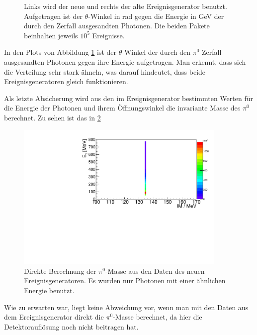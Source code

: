 \documentclass[a4paper,11pt,oneside,final,german,openbib,pdftex]{scrbook}
\begin{document}
{\begin{figure}[h!]
	\caption[Simulation: Vergleich der der Ereignisgeneratoren]{Links wird der neue und rechts der alte Ereignisgenerator benutzt. Aufgetragen ist der $\theta$-Winkel in rad gegen die Energie in GeV der durch den Zerfall ausgesandten Photonen. Die beiden Pakete beinhalten jeweils $10^5$ Ereignisse.}
	\label{fig:Vergleich-der-beiden-Guns}
\end{figure}

In den Plots von Abbildung \ref{fig:Vergleich-der-beiden-Guns} ist der $\theta$-Winkel der durch den $\pi^0$-Zerfall ausgesandten Photonen gegen ihre Energie aufgetragen. 
Man erkennt, dass sich die Verteilung sehr stark \"ahneln, was darauf hindeutet, dass beide Ereignisgeneratoren gleich funktionieren.

Als letzte Absicherung wird aus den im Ereignisgenerator bestimmten Werten f\"ur die Energie der Photonen und ihrem \"Offnungswinkel die invariante Masse des $\pi^0$ berechnet. Zu sehen ist das in \cref{fig:Direkte-Berechnung-der-PI-Masse}

\begin{figure}[h!]
	\centering

		\centering
		\includegraphics[width=0.9\textwidth]{20172504MCTrueME1}
		\caption[Simulation: Direkte Berechnung der $\pi^0$-Masse aus dem neuen Ereignisgenerator]{Direkte Berechnung der $\pi^0$-Masse aus den Daten des neuen Ereignisgeneratoren. Es wurden nur Photonen mit einer \"ahnlichen Energie benutzt.}
		\label{fig:Direkte-Berechnung-der-PI-Masse}

\end{figure}

Wie zu erwarten war, liegt keine Abweichung vor, wenn man mit den Daten aus dem Ereignisgenerator direkt die $\pi^0$-Masse berechnet, da hier die Detektoraufl\"osung noch nicht beitragen hat.

}
\end{document}
